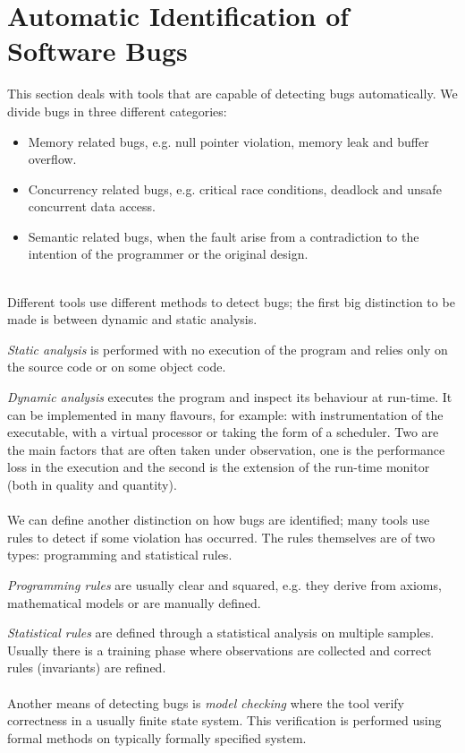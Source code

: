 
\section{Automatic Identification of Software Bugs}
This section deals with tools that are capable of detecting bugs automatically. We divide bugs in three different categories:
\begin{itemize}
    \item Memory related bugs, e.g. null pointer violation, memory leak and buffer overflow.
    \item Concurrency related bugs, e.g. critical race conditions, deadlock and unsafe concurrent data access.
    \item Semantic related bugs, when the fault arise from a contradiction to the intention of the programmer or the original design.
\end{itemize}
\\
Different tools use different methods to detect bugs; the first big distinction to be made is between dynamic and static analysis.

\emph{Static analysis} is performed with no execution of the program and relies only on the source code or on some object code. 

\emph{Dynamic analysis} executes the program and inspect its behaviour at run-time. It can be implemented in many flavours, for example: with instrumentation of the executable, with a virtual processor or taking the form of a scheduler. Two are the main factors that are often taken under observation, one is the performance loss in the execution and the second is the extension of the run-time monitor (both in quality and quantity).
\\
\\
We can define another distinction on how bugs are identified; many tools use rules to detect if some violation has occurred. The rules themselves are of two types: programming and statistical rules.

\emph{Programming rules} are usually clear and squared, e.g. they derive from axioms, mathematical models or are manually defined.

\emph{Statistical rules} are defined through a statistical analysis on multiple samples. Usually there is a training phase where observations are collected and correct rules (invariants) are refined.
\\
\\
Another means of detecting bugs is \emph{model checking} where the tool verify correctness in a usually finite state system. This verification is performed using formal methods on typically formally specified system. 

